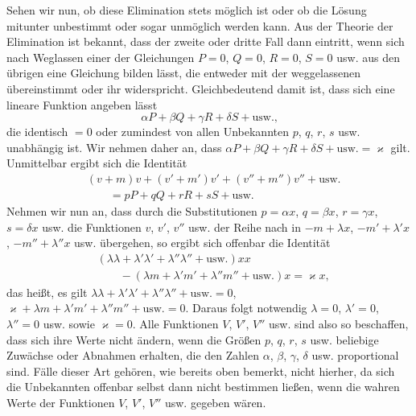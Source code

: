Sehen wir nun, ob diese Elimination stets möglich ist oder ob die Lösung mitunter unbestimmt oder sogar unmöglich werden kann. Aus der Theorie der Elimination ist bekannt, dass der zweite oder dritte Fall dann eintritt, wenn sich nach Weglassen einer der Gleichungen $P=0$, $Q=0$, $R=0$, $S=0$ usw. aus den übrigen eine Gleichung bilden lässt, die entweder mit der weggelassenen übereinstimmt oder ihr widerspricht. Gleichbedeutend damit ist, dass sich eine lineare Funktion angeben lässt
\[
\alpha P+\beta Q+\gamma R+\delta S+\text{usw.,}
\]
die identisch $=0$ oder zumindest von allen Unbekannten $p$, $q$, $r$, $s$ usw. unabhängig ist. Wir nehmen daher an, dass $\alpha P+\beta Q+\gamma R+\delta S+\text{usw.}=\varkappa$ gilt. Unmittelbar ergibt sich die Identität
\[
\begin{aligned}
&(v+m)v+(v'+m')v'+(v''+m'')v''+\text{usw.}\\
&\qquad=pP+qQ+rR+sS+\text{usw.}
\end{aligned}
\]
Nehmen wir nun an, dass durch die Substitutionen $p=\alpha x$, $q=\beta x$, $r=\gamma x$, $s=\delta x$ usw. die Funktionen $v$, $v'$, $v''$ usw. der Reihe nach in $-m+\lambda x$, $-m'+\lambda'x$, $-m''+\lambda''x$ usw. übergehen, so ergibt sich offenbar die Identität
\[
\begin{aligned}
&(\lambda\lambda+\lambda'\lambda'+\lambda''\lambda''+\text{usw.})xx\\
&\qquad-(\lambda m+\lambda'm'+\lambda''m''+\text{usw.})x=\varkappa x,
\end{aligned}
\]
das heißt, es gilt $\lambda\lambda+\lambda'\lambda'+\lambda''\lambda''+\text{usw.}=0$, $\varkappa+\lambda m+\lambda'm'+\lambda''m''+\text{usw.}=0$. Daraus folgt notwendig $\lambda=0$, $\lambda'=0$, $\lambda''=0$ usw. sowie $\varkappa=0$. Alle Funktionen $V$, $V'$, $V''$ usw. sind also so beschaffen, dass sich ihre Werte nicht ändern, wenn die Größen $p$, $q$, $r$, $s$ usw. beliebige Zuwächse oder Abnahmen erhalten, die den Zahlen $\alpha$, $\beta$, $\gamma$, $\delta$ usw. proportional sind. Fälle dieser Art gehören, wie bereits oben bemerkt, nicht hierher, da sich die Unbekannten offenbar selbst dann nicht bestimmen ließen, wenn die wahren Werte der Funktionen $V$, $V'$, $V''$ usw. gegeben wären.

